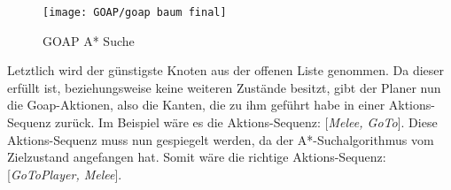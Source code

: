 \begin{figure}[h]
  \centering
  \texttt{[image: GOAP/goap baum final]}
	\captionsetup{justification=justified, format=plain}
  \caption{GOAP A* Suche}
  \label{fig:goap5}
\end{figure}

Letztlich wird der g\"{u}nstigste Knoten aus der offenen Liste genommen. Da dieser erf\"{u}llt ist, beziehungsweise keine weiteren Zust\"{a}nde besitzt, gibt der Planer nun die Goap-Aktionen, also die Kanten, die zu ihm gef\"{u}hrt habe in einer Aktions-Sequenz zur\"{u}ck. Im Beispiel w\"{a}re es die Aktions-Sequenz: [\textit{Melee, GoTo}]. Diese Aktions-Sequenz muss nun gespiegelt werden, da der A*-Suchalgorithmus vom Zielzustand angefangen hat. Somit w\"{a}re die richtige Aktions-Sequenz: [\textit{GoToPlayer, Melee}].